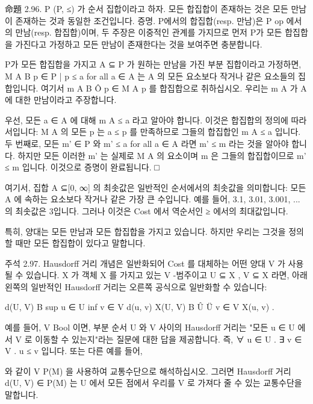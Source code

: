\documentclass[11pt, a4paper, twoside, openany]{book}
\begin{document}
{\par\medskip
命題 2.96. P  (P, ≤) 가 순서 집합이라고 하자. 모든 합집합이 존재하는 것은 모든 만남이 존재하는 것과 동일한 조건입니다. 증명. P\hspace{0pt}에서의 합집합(resp. 만남)은 P op 에서의 만남(resp. 합집합)이며, 두 주장은 이중적인 관계를 가지므로 먼저 P\hspace{0pt}가 모든 합집합을 가진다고 가정하고 모든 만남이 존재한다는 것을 보여주면 충분합니다.

\par\medskip
P\hspace{0pt}가 모든 합집합을 가지고 A ⊆ P 가 원하는 만남을 가진 부분 집합이라고 가정하면, M A B {p ∈ P | p ≤ a for all a ∈ A} 는 A 의 모든 요소보다 작거나 같은 요소들의 집합입니다. 여기서 m A B Ô p ∈ M A p 를 합집합으로 취하십시오. 우리는 m A 가 A 에 대한 만남이라고 주장합니다.

\par\medskip
우선, 모든 a ∈ A 에 대해 m A ≤ a 라고 알아야 합니다. 이것은 합집합의 정의에 따라서입니다: M A 의 모든 p 는 a ≤ p 를 만족하므로 그들의 합집합인 m A ≤ a 입니다. 두 번째로, 모든 m' ∈ P 와 m' ≤ a for all a ∈ A 라면 m' ≤ m 라는 것을 알아야 합니다. 하지만 모든 이러한 m' 는 실제로 M A 의 요소이며 m 은 그들의 합집합이므로 m' ≤ m 입니다. 이것으로 증명이 완료됩니다. □

\par{} 여기서, 집합 A ⊆[0, ∞] 의 최솟값은 일반적인 순서에서의 최솟값을 의미합니다: 모든 A 에 속하는 요소보다 작거나 같은 가장 큰 수입니다. 예를 들어, {3.1, 3.01, 3.001, ...} 의 최솟값은 3\hspace{0pt}입니다. 그러나 이것은 Cost 에서 역순서인 ≥ 에서의 최대값입니다.

\par\medskip
특히, 양대는 모든 만남과 모든 합집합을 가지고 있습니다. 하지만 우리는 그것을 정의할 때만 모든 합집합이 있다고 말합니다.

\par\medskip
주석 2.97. Hausdorff 거리 개념은 일반화되어 Cost 를 대체하는 어떤 양대 V 가 사용될 수 있습니다. X 가 객체 X 를 가지고 있는 V -범주이고 U ⊆ X , V ⊆ X 라면, 아래 왼쪽의 일반적인 Hausdorff 거리는 오른쪽 공식으로 일반화할 수 있습니다:

\par\medskip
d(U, V) B sup
u ∈ U
inf
v ∈ V
d(u, v)
X(U, V) B
Û
Ü
v ∈ V
X(u, v) .

\par\medskip
예를 들어, V  Bool 이면, 부분 순서 U 와 V 사이의 Hausdorff 거리는 "모든 u ∈ U 에서 V 로 이동할 수 있는지"라는 질문에 대한 답을 제공합니다. 즉, ∀ u ∈ U . ∃ v ∈ V . u ≤ v 입니다. 또는 다른 예를 들어, 
\begin{exercisebox}[연습문제 2.62]
와 같이 V  P(M) 을 사용하여 교통수단으로 해석하십시오. 그러면 Hausdorff 거리 d(U, V) ∈ P(M) 는 U 에서 모든 점에서 우리를 V 로 가져다 줄 수 있는 교통수단을 말합니다.
\end{exercisebox}

}
\end{document}
